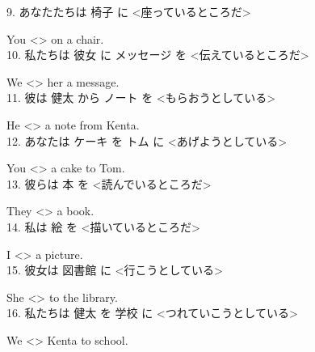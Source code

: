 \documentclass[uplatex,
paper=a4,
fontsize=18pt,
jafontsize=16pt,
number_of_lines=30,
line_length=30zh,
baselineskip=25pt,
]{jlreq}
\begin{document}
9.  あなたたちは 椅子 に <座っているところだ>

  You <\hspace{3em}\hspace{3em}\hspace{2em}> on a chair.
\\

10.  私たちは 彼女 に メッセージ を <伝えているところだ>

  We <\hspace{3em}\hspace{3em}\hspace{2em}> her a message.
\\

11.  彼は 健太 から ノート を <もらおうとしている>

  He <\hspace{3em}\hspace{3em}\hspace{2em}> a note from Kenta.
\\

12.  あなたは ケーキ を トム に <あげようとしている>

  You <\hspace{3em}\hspace{3em}\hspace{2em}> a cake to Tom.
\\

13.  彼らは 本 を <読んでいるところだ>

  They <\hspace{3em}\hspace{3em}\hspace{2em}> a book.
\\

14.  私は 絵 を <描いているところだ>

  I <\hspace{3em}\hspace{3em}\hspace{2em}> a picture.
\\

15.  彼女は 図書館 に <行こうとしている>

  She <\hspace{3em}\hspace{3em}\hspace{2em}> to the library.
\\

16.  私たちは 健太 を 学校 に <つれていこうとしている>

  We <\hspace{3em}\hspace{3em}\hspace{2em}> Kenta to school.
\\
\end{document}

